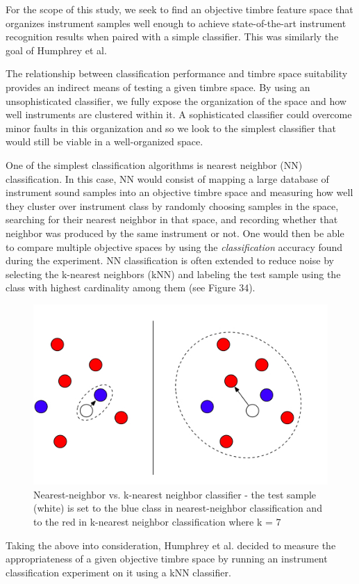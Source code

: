 \documentclass[12pt]{report} 	%
\numberwithin{figure}{chapter}
\numberwithin{table}{chapter}
\numberwithin{equation}{chapter}
\begin{document}
\begin{flushleft}
For the scope of this study, we seek to find an objective timbre feature space that organizes instrument samples well enough to achieve state-of-the-art instrument recognition results when paired with a simple classifier. This was similarly the goal of Humphrey et al.

The relationship between classification performance and timbre space suitability provides an indirect means of testing a given timbre space. By using an unsophisticated classifier, we fully expose the organization of the space and how well instruments are clustered within it. A sophisticated classifier could overcome minor faults in this organization and so we look to the simplest classifier that would still be viable in a well-organized space.

One of the simplest classification algorithms is nearest neighbor (NN) classification. In this case, NN would consist of mapping a large database of instrument sound samples into an objective timbre space and measuring how well they cluster over instrument class by randomly choosing samples in the space, searching for their nearest neighbor in that space, and recording whether that neighbor was produced by the same instrument or not. One would then be able to compare multiple objective spaces by using the \textit{classification} accuracy found during the experiment. NN classification is often extended to reduce noise by selecting the k-nearest neighbors (kNN) and labeling the test sample using the class with highest cardinality among them (see Figure 34).
\begin{figure}[h!]
\begin{center}
\vspace{12pt}
\includegraphics[scale=0.5]{NearestNeighbor}
\caption[Nearest-neighbor vs. k-nearest-neighbor classifier]{Nearest-neighbor vs. k-nearest neighbor classifier - the test sample (white) is set to the blue class in nearest-neighbor classification and to the red in k-nearest neighbor classification where k = 7}
\end{center}
\vspace{6pt}
\end{figure}
Taking the above into consideration, Humphrey et al. decided to measure the appropriateness of a given objective timbre space by running an instrument classification experiment on it using a kNN classifier.


\end{flushleft}
\end{document}
